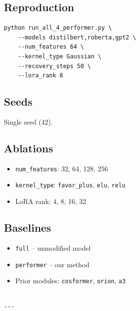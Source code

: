 \subsection{Reproduction}

\begin{lstlisting}
python run_all_4_performer.py \
    --models distilbert,roberta,gpt2 \
    --num_features 64 \
    --kernel_type Gaussian \
    --recovery_steps 50 \
    --lora_rank 8
\end{lstlisting}

\subsection{Seeds}

Single seed (42).

\subsection{Ablations}

\begin{itemize}
\item \texttt{num\_features}: 32, 64, 128, 256
\item \texttt{kernel\_type}: \texttt{favor\_plus}, \texttt{elu}, \texttt{relu}
\item LoRA rank: 4, 8, 16, 32

\end{itemize}
\subsection{Baselines}

\begin{itemize}
\item \texttt{full} -- unmodified model
\item \texttt{performer} -- our method
\item Prior modules: \texttt{cosformer}, \texttt{orion}, \texttt{a3}
\end{itemize}
\begin{lstlisting}

---
\end{lstlisting}